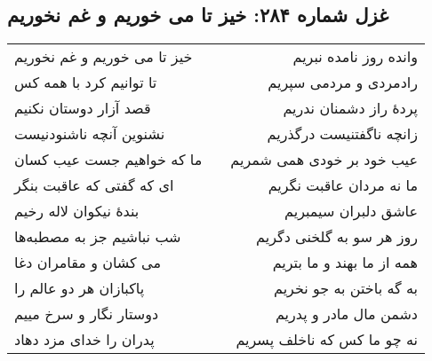 \begin{center}
\section*{غزل شماره ۲۸۴: خیز تا می خوریم و غم نخوریم}
\label{sec:284}
\begin{longtable}{l p{0.5cm} r}
خیز تا می خوریم و غم نخوریم
&&
وانده روز نامده نبریم
\\
تا توانیم کرد با همه کس
&&
رادمردی و مردمی سپریم
\\
قصد آزار دوستان نکنیم
&&
پردهٔ راز دشمنان ندریم
\\
نشنوین آنچه ناشنودنیست
&&
زانچه ناگفتنیست درگذریم
\\
ما که خواهیم جست عیب کسان
&&
عیب خود بر خودی همی شمریم
\\
ای که گفتی که عاقبت بنگر
&&
ما نه مردان عاقبت نگریم
\\
بندهٔ نیکوان لاله رخیم
&&
عاشق دلبران سیمبریم
\\
شب نباشیم جز به مصطبه‌ها
&&
روز هر سو به گلخنی دگریم
\\
می کشان و مقامران دغا
&&
همه از ما بهند و ما بتریم
\\
پاکبازان هر دو عالم را
&&
به گه باختن به جو نخریم
\\
دوستار نگار و سرخ مییم
&&
دشمن مال مادر و پدریم
\\
پدران را خدای مزد دهاد
&&
نه چو ما کس که ناخلف پسریم
\\
\end{longtable}
\end{center}
